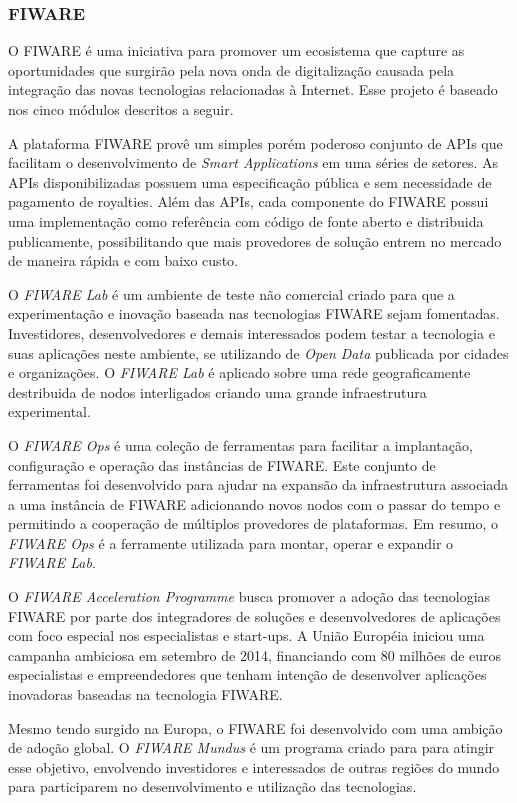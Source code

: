 \subsubsection{FIWARE}
O FIWARE é uma iniciativa para promover um ecosistema que capture as oportunidades que surgirão pela nova onda
de digitalização causada pela integração das novas tecnologias relacionadas à Internet. Esse projeto é
baseado nos cinco módulos descritos a seguir.

A plataforma FIWARE provê um simples porém poderoso conjunto de APIs que facilitam o desenvolvimento de \textit{Smart Applications}
em uma séries de setores. As APIs disponibilizadas possuem uma especificação pública e sem necessidade de pagamento de royalties.
Além das APIs, cada componente do FIWARE possui uma implementação como referência com código de fonte aberto e distribuida
publicamente, possibilitando que mais provedores de solução entrem no mercado de maneira rápida e com baixo custo.

O \textit{FIWARE Lab} é um ambiente de teste não comercial criado para que a experimentação e inovação baseada nas tecnologias
FIWARE sejam fomentadas. Investidores, desenvolvedores e demais interessados podem testar a tecnologia e suas aplicações neste
ambiente, se utilizando de \textit{Open Data} publicada por cidades e organizações. O \textit{FIWARE Lab} é aplicado sobre
uma rede geograficamente destribuida de nodos interligados criando uma grande infraestrutura experimental.

O \textit{FIWARE Ops} é uma coleção de ferramentas para facilitar a implantação, configuração e operação das instâncias de FIWARE.
Este conjunto de ferramentas foi desenvolvido para ajudar na expansão da infraestrutura associada a uma instância de FIWARE
adicionando novos nodos com o passar do tempo e permitindo a cooperação de múltiplos provedores de plataformas. Em resumo,
o \textit{FIWARE Ops} é a ferramente utilizada para montar, operar e expandir o \textit{FIWARE Lab}.

O \textit{FIWARE Acceleration Programme} busca promover a adoção das tecnologias FIWARE por parte dos integradores de
soluções e desenvolvedores de aplicações com foco especial nos especialistas e start-ups. A União Européia iniciou uma
campanha ambiciosa em setembro de 2014, financiando com 80 milhões de euros especialistas e empreendedores que tenham
intenção de desenvolver aplicações inovadoras baseadas na tecnologia FIWARE.

Mesmo tendo surgido na Europa, o FIWARE foi desenvolvido com uma ambição de adoção global. O \textit{FIWARE Mundus} é um programa
criado para para atingir esse objetivo, envolvendo investidores e interessados de outras regiões do mundo para participarem
no desenvolvimento e utilização das tecnologias.
